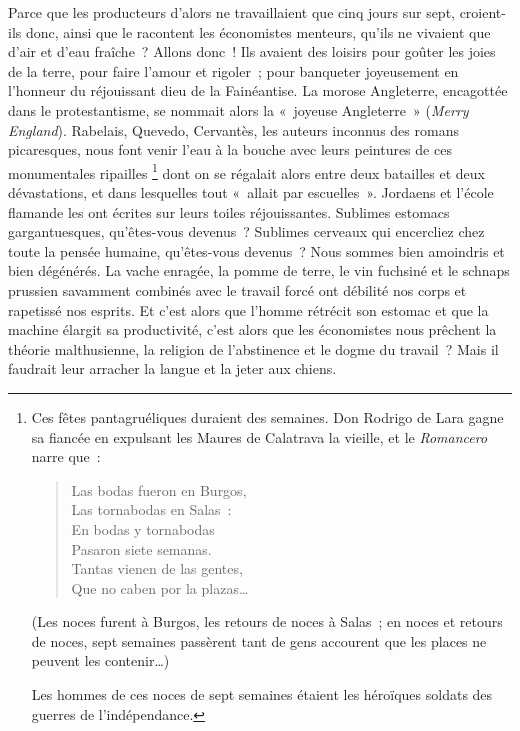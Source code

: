 \documentclass[french,twoside]{book} %
\begin{document}
Parce que les producteurs d’alors ne travaillaient que cinq jours sur sept, croient-ils donc, ainsi que le racontent les économistes menteurs, qu’ils ne vivaient que d’air et d’eau fraîche ? Allons donc ! Ils avaient des loisirs pour goûter les joies de la terre, pour faire l’amour et rigoler ; pour banqueter joyeusement en l’honneur du réjouissant dieu de la Fainéantise. La morose Angleterre, encagottée dans le protestantisme, se nommait alors la « joyeuse Angleterre » (\emph{Merry England}). Rabelais, Quevedo, Cervantès, les auteurs inconnus des romans picaresques, nous font venir l’eau à la bouche avec leurs peintures de ces monumentales ripailles \footnote{ \noindent Ces fêtes pantagruéliques duraient des semaines. Don Rodrigo de Lara gagne sa fiancée en expulsant les Maures de Calatrava la vieille, et le \emph{Romancero} narre que :\par
  
\begin{verse}
Las bodas fueron en Burgos,\\
 Las tornabodas en Salas :\\
 En bodas y tornabodas\\
 Pasaron siete semanas.\\
 Tantas vienen de las gentes,\\
 Que no caben por la plazas…\\
\end{verse}
\par
 \noindent (Les noces furent à Burgos, les retours de noces à Salas ; en noces et retours de noces, sept semaines passèrent tant de gens accourent que les places ne peuvent les contenir…)\par
 Les hommes de ces noces de sept semaines étaient les héroïques soldats des guerres de l’indépendance.
 } dont on se régalait alors entre deux batailles et deux dévastations, et dans lesquelles tout « allait par escuelles ». Jordaens et l’école flamande les ont écrites sur leurs toiles réjouissantes. Sublimes estomacs gargantuesques, qu’êtes-vous devenus ? Sublimes cerveaux qui encercliez chez toute la pensée humaine, qu’êtes-vous devenus ? Nous sommes bien amoindris et bien dégénérés. La vache enragée, la pomme de terre, le vin fuchsiné et le schnaps prussien savamment combinés avec le travail forcé ont débilité nos corps et rapetissé nos esprits. Et c’est alors que l’homme rétrécit son estomac et que la machine élargit sa productivité, c’est alors que les économistes nous prêchent la théorie malthusienne, la religion de l’abstinence et le dogme du travail ? Mais il faudrait leur arracher la langue et la jeter aux chiens.\par
\end{document}
